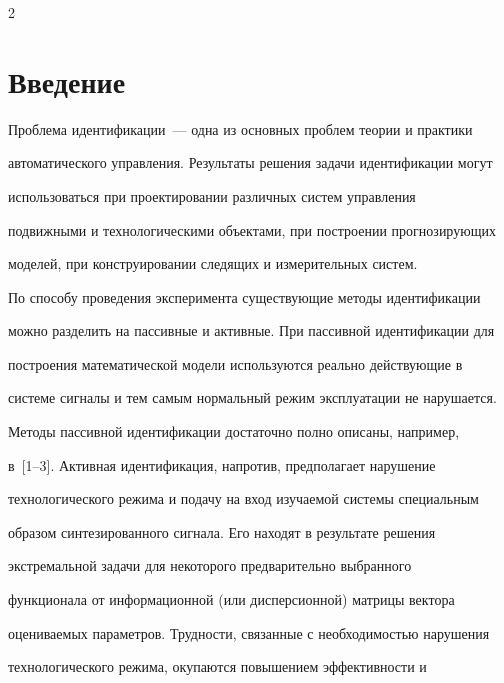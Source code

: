       \begin{multicols}{2}





            \label{st\stat}





\section{Введение}





  Проблема идентификации~--- одна из основных проблем теории и практики


автоматического управ\-ле\-ния. Результаты решения задачи идентификации могут


использоваться при проектировании различных систем управления


подвижными и технологическими объектами, при построении прогнозирующих


моделей, при конструировании следящих и измерительных систем.





  По способу проведения эксперимента существующие методы идентификации


можно разделить на пассивные и активные. При пассивной идентификации для


построения математической модели используются реально действующие в


системе сигналы и тем самым нормальный режим эксплуатации не нарушается.


Методы пассивной идентификации достаточно полно описаны, например,


  в~[1--3]. Активная идентификация, напротив, предполагает нарушение


технологического режима и подачу на вход изучаемой системы специальным


образом синтезированного сигнала. Его находят в результате решения


экстремальной задачи для некоторого предварительно выбранного


функционала от информационной (или дисперсионной) матрицы вектора


оцениваемых параметров. Трудности, связанные с необходимостью нарушения


технологического режима, окупаются повышением эффективности и



\end{multicols}
